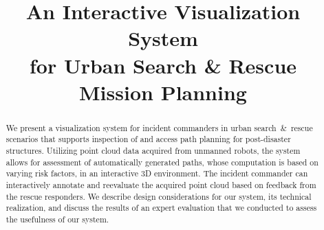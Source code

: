 \documentclass[conference,10pt,letter]{IEEEtran}
\begin{document}
\title{An Interactive Visualization System \\%
for Urban Search \& Rescue Mission Planning}

\author{
    \and
    \and
    \and
}


\maketitle


\begin{abstract}
We present a visualization system for incident commanders in urban search~\&~rescue scenarios that supports inspection of and access path planning for post-disaster structures. Utilizing point cloud data acquired from unmanned robots, the system allows for assessment of automatically generated paths, whose computation is based on varying risk factors, in an interactive 3D environment. The incident commander  can interactively annotate and reevaluate the acquired point cloud based on feedback from the rescue responders. We describe design considerations for our system, its technical realization, and discuss the results of an expert evaluation that we conducted to assess the usefulness of our system.
\end{abstract}
\end{document}
